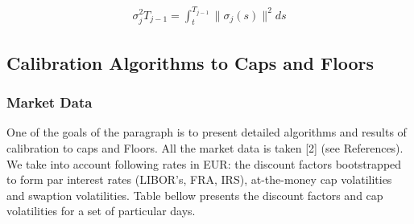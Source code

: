 \documentclass[11pt]{article}
\numberwithin{equation}{subsection}
\begin{document}
\begin{eqnarray*}
	\sigma_j^2T_{j-1} = \int_{t}^{T_{j-1}} \|\sigma_{j}(s)\|^2 ds
\end{eqnarray*}

\subsection{Calibration Algorithms to Caps and Floors}
\subsubsection{Market Data}
One of the goals of the paragraph is to present detailed algorithms and results of calibration to caps and Floors.
All the market data is taken [2] (see References). We take into account following rates in EUR: the discount factors bootstrapped to form par interest rates (LIBOR's, FRA, IRS), at-the-money cap volatilities and swaption volatilities. Table bellow presents the discount factors and cap volatilities for a
set of particular days.
\vskip 0.4cm 		
\end{document}
